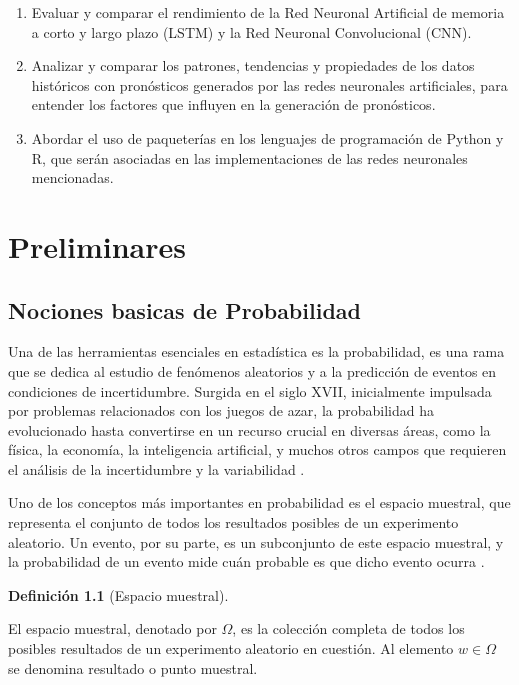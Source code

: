 \documentclass[
  us-letterpaper,
]{scrreprt}
\theoremstyle{plain}
\theoremstyle{definition}
\newtheorem{definition}{Definición}[chapter]
\theoremstyle{definition}
\theoremstyle{remark}
\begin{document}
\begin{enumerate}
\def\labelenumi{\arabic{enumi}.}
\item
  Evaluar y comparar el rendimiento de la Red Neuronal Artificial de
  memoria a corto y largo plazo (LSTM) y la Red Neuronal Convolucional
  (CNN).
\item
  Analizar y comparar los patrones, tendencias y propiedades de los
  datos históricos con pronósticos generados por las redes neuronales
  artificiales, para entender los factores que influyen en la generación
  de pronósticos.
\item
  Abordar el uso de paqueterías en los lenguajes de programación de
  Python y R, que serán asociadas en las implementaciones de las redes
  neuronales mencionadas.
\end{enumerate}

\part{Preliminares}

\chapter{Nociones basicas de
Probabilidad}\label{nociones-basicas-de-probabilidad}

Una de las herramientas esenciales en estadística es la probabilidad, es
una rama que se dedica al estudio de fenómenos aleatorios y a la
predicción de eventos en condiciones de incertidumbre. Surgida en el
siglo XVII, inicialmente impulsada por problemas relacionados con los
juegos de azar, la probabilidad ha evolucionado hasta convertirse en un
recurso crucial en diversas áreas, como la física, la economía, la
inteligencia artificial, y muchos otros campos que requieren el análisis
de la incertidumbre y la variabilidad
\autocite{charles1997introduction}.

Uno de los conceptos más importantes en probabilidad es el espacio
muestral, que representa el conjunto de todos los resultados posibles de
un experimento aleatorio. Un evento, por su parte, es un subconjunto de
este espacio muestral, y la probabilidad de un evento mide cuán probable
es que dicho evento ocurra \autocite{ross2014introduction}.

\begin{definition}[Espacio
muestral]\protect\hypertarget{def-EM}{}\label{def-EM}

El espacio muestral, denotado por \(\Omega\), es la colección completa
de todos los posibles resultados de un experimento aleatorio en
cuestión. Al elemento \(w \in \Omega\) se denomina resultado o punto
muestral.

\end{definition}
\end{document}

